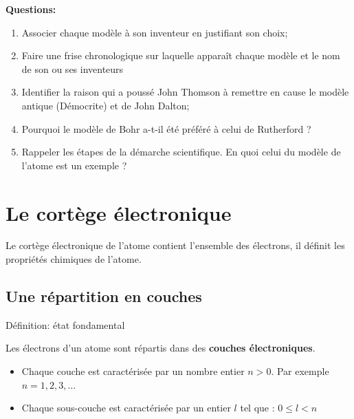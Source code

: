 \documentclass[french]{article}
\begin{document}
\noindent\textbf{Questions:} 

\begin{enumerate}
	\item Associer chaque modèle à son inventeur en justifiant son choix;
	\item Faire une frise chronologique sur laquelle apparaît chaque modèle et le nom de son ou ses inventeurs
	\item Identifier la raison qui a poussé John Thomson à remettre en cause le modèle antique (Démocrite) et de John Dalton;
	\item Pourquoi le modèle de Bohr a-t-il été préféré à celui de Rutherford ? 
	\item Rappeler les étapes de la démarche scientifique. En quoi celui du modèle de l'atome est un exemple ? 
\end{enumerate}






\clearpage
\section{Le cortège électronique} 


Le cortège électronique de l'atome contient l'ensemble des électrons, il définit les propriétés chimiques de l'atome.


\subsection{Une répartition en couches}

\begin{definition}{Définition: état fondamental}
\bigskip

\dotfill \bigskip

\dotfill
\end{definition}

Les électrons d'un atome sont répartis dans des \textbf{couches électroniques}.
\begin{itemize}
	\item Chaque couche est caractérisée par un nombre entier $n>0$. 
	Par exemple $n=1,2,3,\dots$ 
	

	\item Chaque sous-couche est caractérisée par un entier $l$ tel que : $0\leq l < n$
\end{itemize}
\end{document}
